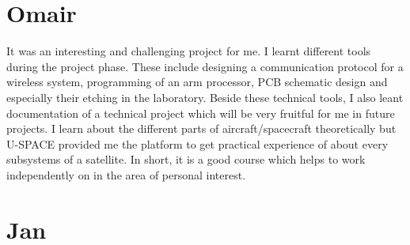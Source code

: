 \section{Omair}
It was an interesting and challenging project for me. I learnt different tools during the project phase. These include designing a communication protocol for a wireless system, programming of an arm processor, \ac{PCB} schematic design and especially their etching in the laboratory. Beside these technical tools, I also leant documentation of a technical project which will be very fruitful for me in future projects. I learn about the different parts of aircraft/spacecraft theoretically but \ac{U-SPACE} provided me the platform to get practical experience of about every subsystems of a satellite. In short, it is a good course which helps to work independently on in the area of personal interest. 
%
\section{Jan}
%
%
